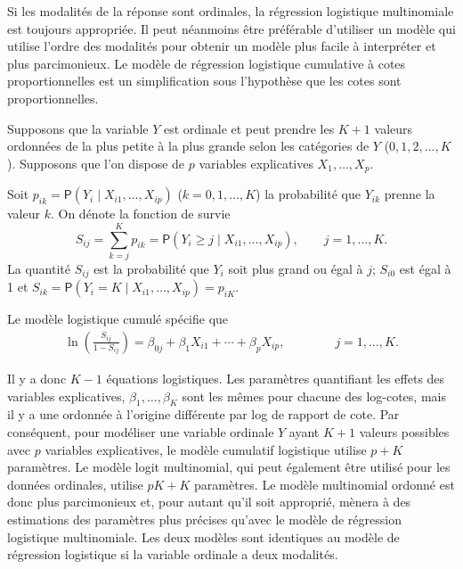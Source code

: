 \documentclass[
  11pt,
  letterpaper,
]{book}
\theoremstyle{definition}
\theoremstyle{definition}
\theoremstyle{definition}
\theoremstyle{remark}
\begin{document}
Si les modalités de la réponse sont ordinales, la régression logistique multinomiale est toujours appropriée. Il peut néanmoins être préférable d'utiliser un modèle qui utilise l'ordre des modalités pour obtenir un modèle plus facile à interpréter et plus parcimonieux. Le modèle de régression logistique cumulative à cotes proportionnelles est un simplification sous l'hypothèse que les cotes sont proportionnelles.

Supposons que la variable \(Y\) est ordinale et peut prendre les \(K+1\) valeurs ordonnées de la plus petite à la plus grande selon les catégories de \(Y\) (\(0, 1, 2, \ldots, K\)). Supposons que l'on dispose de \(p\) variables explicatives \(X_1, \ldots, X_p\).

Soit \(p_{ik}={\mathsf P}\left(Y_i \mid X_{i1}, \ldots, X_{ip}\right)\) (\(k=0, 1, \ldots, K\)) la probabilité que \(Y_{ik}\) prenne la valeur \(k\). On dénote la fonction de survie
\[S_{ij}=\sum_{k=j}^K p_{ik}= {\mathsf P}\left(Y_{i} \geq j\mid X_{i1}, \ldots, X_{ip}\right), \qquad j=1, \ldots, K.
\]
La quantité \(S_{ij}\) est la probabilité que \(Y_i\) soit plus grand ou égal à \(j\); \(S_{i0}\) est égal à 1 et \(S_{ik} = {\mathsf P}\left(Y_i=K \mid X_{i1}, \ldots, X_{ip}\right)=p_{iK}\).

Le modèle logistique cumulé spécifie que
\begin{align*}
\ln \left( \frac{S_{ij}}{1-S_{ij}}\right) = \beta_{0j} + \beta_1 X_{i1} + \cdots + \beta_p X_{ip}, \qquad \qquad  j=1, \ldots, K.
\end{align*}

Il y a donc \(K-1\) équations logistiques. Les paramètres quantifiant les effets des variables explicatives, \(\beta_1, \ldots, \beta_K\) sont les mêmes pour chacune des log-cotes, mais il y a une ordonnée à l'origine différente par log de rapport de cote. Par conséquent, pour modéliser une variable ordinale \(Y\) ayant \(K+1\) valeurs possibles avec \(p\) variables explicatives, le modèle cumulatif logistique utilise \(p + K\) paramètres. Le modèle logit multinomial, qui peut également être utilisé pour les données ordinales, utilise \(pK + K\) paramètres. Le modèle multinomial ordonné est donc plus parcimonieux et, pour autant qu'il soit approprié, mènera à des estimations des paramètres plus précises qu'avec le modèle de régression logistique multinomiale. Les deux modèles sont identiques au modèle de régression logistique si la variable ordinale a deux modalités.
\end{document}

